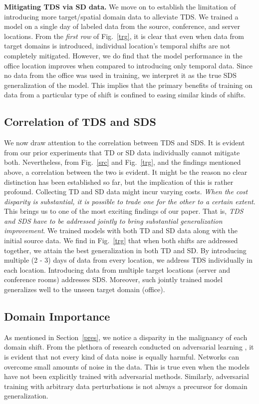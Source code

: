 \documentclass{article}
\begin{document}
\textbf{Mitigating TDS via SD data.}  We move on to establish the limitation of introducing more target/spatial domain data to alleviate TDS. We trained a model on a single day of labeled data from the source, conference, and server locations. From the \emph{first row} of Fig.~\ref{trg}, it is clear that even when data from target domains is introduced, individual location's temporal shifts are not completely mitigated. However, we do find that the model performance in the office location improves when compared to introducing only temporal data. Since no data from the office was used in training, we interpret it as the true SDS generalization of the model. This implies that the primary benefits of training on data from a particular type of shift is confined to easing similar kinds of shifts. 

\subsection{Correlation of TDS and SDS}
We now draw attention to the correlation between TDS and SDS. It is evident from our prior experiments that TD or SD data individually cannot mitigate both. Nevertheless, from Fig.~\ref{src} and Fig.~\ref{trg}, and the findings mentioned above, a correlation between the two is evident. It might be the reason no clear distinction has been established so far, but the implication of this is rather profound. Collecting TD and SD data might incur varying costs. \emph{When the cost disparity is substantial, it is possible to trade one for the other to a certain extent}. This brings us to one of the most exciting findings of our paper. That is, \emph{TDS and SDS have to be addressed jointly to bring substantial generalization improvement}. We trained models with both TD and SD data along with the initial source data. We find in Fig.~\ref{trg} that when both shifts are addressed together, we attain the best generalization in both TD and SD. By introducing multiple (2 - 3) days of data from every location, we address TDS individually in each location. Introducing data from multiple target locations (server and conference rooms) addresses SDS. Moreover, such jointly trained model generalizes well to the unseen target domain (office).

\subsection{Domain Importance}
\label{dom_imp}

As mentioned in Section~\ref{pres}, we notice a disparity in the malignancy of each domain shift. From the plethora of research conducted on adversarial learning \cite{chakraborty2018adversarial}, it is evident that not every kind of data noise is equally harmful. Networks can overcome small amounts of noise in the data. This is true even when the models have not been explicitly trained with adversarial methods. Similarly, adversarial training with arbitrary data perturbations is not always a precursor for domain generalization. 
\end{document}
